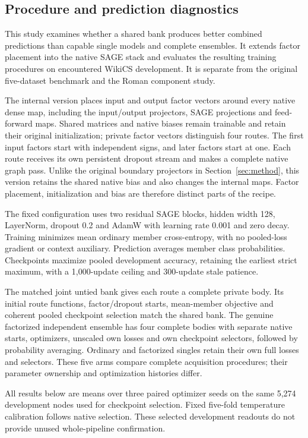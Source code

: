 \subsection{Procedure and prediction diagnostics}\label{app:internal-sage-F-details}
This study examines whether a shared bank produces better combined predictions than capable single models and complete ensembles. It extends factor placement into the native SAGE stack and evaluates the resulting training procedures on encountered WikiCS development. It is separate from the original five-dataset benchmark and the Roman component study.

The internal version places input and output factor vectors around every native dense map, including the input/output projectors, SAGE projections and feed-forward maps. Shared matrices and native biases remain trainable and retain their original initialization; private factor vectors distinguish four routes. The first input factors start with independent signs, and later factors start at one. Each route receives its own persistent dropout stream and makes a complete native graph pass. Unlike the original boundary projectors in Section~\ref{sec:method}, this version retains the shared native bias and also changes the internal maps. Factor placement, initialization and bias are therefore distinct parts of the recipe.

The fixed configuration uses two residual SAGE blocks, hidden width 128, LayerNorm, dropout 0.2 and AdamW with learning rate 0.001 and zero decay. Training minimizes mean ordinary member cross-entropy, with no pooled-loss gradient or context auxiliary. Prediction averages member class probabilities. Checkpoints maximize pooled development accuracy, retaining the earliest strict maximum, with a 1,000-update ceiling and 300-update stale patience.

The matched joint untied bank gives each route a complete private body. Its initial route functions, factor/dropout starts, mean-member objective and coherent pooled checkpoint selection match the shared bank. The genuine factorized independent ensemble has four complete bodies with separate native starts, optimizers, unscaled own losses and own checkpoint selectors, followed by probability averaging. Ordinary and factorized singles retain their own full losses and selectors. These five arms compare complete acquisition procedures; their parameter ownership and optimization histories differ.

All results below are means over three paired optimizer seeds on the same 5,274 development nodes used for checkpoint selection. Fixed five-fold temperature calibration follows native selection. These selected development readouts do not provide unused whole-pipeline confirmation.

